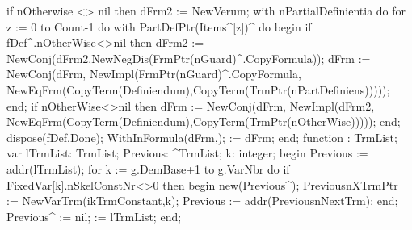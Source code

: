       if nOtherwise <> nil then dFrm2 := NewVerum;
      with nPartialDefinientia do
         for z := 0 to Count-1 do
            with PartDefPtr(Items^[z])^ do
         begin
            if fDef^.nOtherWise<>nil then
               dFrm2 := NewConj(dFrm2,NewNegDis(FrmPtr(nGuard)^.CopyFormula));
            dFrm := NewConj(dFrm,
                            NewImpl(FrmPtr(nGuard)^.CopyFormula,
                                    NewEqFrm(CopyTerm(Definiendum),CopyTerm(TrmPtr(nPartDefiniens)))));
         end;
      if nOtherWise<>nil then
         dFrm := NewConj(dFrm,
                         NewImpl(dFrm2,
                                 NewEqFrm(CopyTerm(Definiendum),CopyTerm(TrmPtr(nOtherWise)))));
   end;
   dispose(fDef,Done);
   WithInFormula(dFrm,);
    := dFrm;
end;
\eatline
{}\nwendcode{}\nwdocspar
\nwenddocs{}\endmoddef\nwstartdeflinemarkup{}\nwenddeflinemarkup
function : TrmList;
var
   lTrmList: TrmList;
   Previous: ^TrmList;
   k: integer;
begin
   Previous := addr(lTrmList);
   for k := g.DemBase+1 to g.VarNbr do
      if FixedVar[k].nSkelConstNr<>0 then
      begin
         new(Previous^);
         Previous^^.XTrmPtr := NewVarTrm(ikTrmConstant,k);
         Previous := addr(Previous^^.NextTrm);
      end;
   Previous^ := nil;
    := lTrmList;
end;
\eatline
{}\nwendcode{}\nwdocspar
\nwenddocs{}\endmoddef\nwstartdeflinemarkup{}\nwenddeflinemarkup
